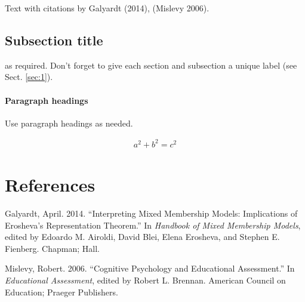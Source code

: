 \documentclass[smallextended]{svjour3}       %
\begin{document}
Text with citations by Galyardt (2014), (Mislevy 2006).

\hypertarget{sec:2}{%
\subsection{Subsection title}\label{sec:2}}

as required. Don't forget to give each section and subsection a unique
label (see Sect. \ref{sec:1}).

\hypertarget{paragraph-headings}{%
\paragraph{Paragraph headings}\label{paragraph-headings}}

Use paragraph headings as needed.

\begin{align}
a^2+b^2=c^2
\end{align}

\hypertarget{references}{%
\section*{References}\label{references}}

\hypertarget{refs}{}
\leavevmode\hypertarget{ref-Galyardt14mmm}{}%
Galyardt, April. 2014. ``Interpreting Mixed Membership Models:
Implications of Erosheva's Representation Theorem.'' In \emph{Handbook
of Mixed Membership Models}, edited by Edoardo M. Airoldi, David Blei,
Elena Erosheva, and Stephen E. Fienberg. Chapman; Hall.

\leavevmode\hypertarget{ref-Mislevy06Cog}{}%
Mislevy, Robert. 2006. ``Cognitive Psychology and Educational
Assessment.'' In \emph{Educational Assessment}, edited by Robert L.
Brennan. American Council on Education; Praeger Publishers.



\end{document}
